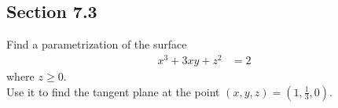 \subsection{Section 7.3}

\begin{tcolorbox}[
        title={Problem 16},
        valign=center,
        nobeforeafter,
        colframe=gray!95!black
    ]
    Find a parametrization of the surface
    \begin{align}
        x^3 + 3xy + z^2 &= 2
    \end{align}
    where \(z \geq 0\). \\
    
    Use it to find the tangent plane at the point \((x, y, z) = \left(1, \frac{1}{3}, 0\right)\).
\end{tcolorbox}

